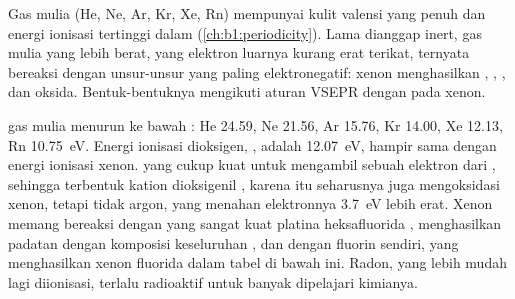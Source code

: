 Gas mulia (He, Ne, Ar, Kr, Xe, Rn) mempunyai kulit valensi yang penuh dan
energi ionisasi tertinggi dalam  (\cref{ch:b1:periodicity}).
Lama dianggap inert, gas mulia yang lebih berat, yang elektron luarnya
kurang erat terikat, ternyata bereaksi dengan unsur-unsur yang paling
elektronegatif: xenon menghasilkan , , , dan
oksida. Bentuk-bentuknya mengikuti aturan VSEPR dengan  pada xenon.

\begin{example}
 gas mulia menurun ke bawah : He
24.59, Ne 21.56, Ar 15.76, Kr 14.00, Xe 12.13, Rn 10.75~eV. Energi
ionisasi dioksigen, , adalah 12.07~eV, hampir sama
dengan energi ionisasi xenon.  yang cukup kuat untuk mengambil
sebuah elektron dari , sehingga terbentuk kation dioksigenil
, karena itu seharusnya juga mengoksidasi xenon, tetapi tidak
argon, yang menahan elektronnya 3.7~eV lebih erat. Xenon memang bereaksi
dengan  yang sangat kuat platina heksafluorida ,
menghasilkan padatan dengan komposisi keseluruhan , dan dengan
fluorin sendiri, yang menghasilkan xenon fluorida dalam tabel di bawah
ini. Radon, yang lebih mudah lagi diionisasi, terlalu radioaktif untuk
banyak dipelajari kimianya.
\end{example}

